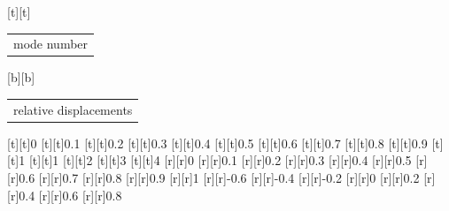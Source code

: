 %    
%
%
\begin{psfrags}%
\psfragscanon%
%
[t][t]{\color[rgb]{0,0,0}\setlength{\tabcolsep}{0pt}\begin{tabular}{c}mode number\end{tabular}}%
[b][b]{\color[rgb]{0,0,0}\setlength{\tabcolsep}{0pt}\begin{tabular}{c}relative displacements\end{tabular}}%
%
[t][t]{0}%
[t][t]{0.1}%
[t][t]{0.2}%
[t][t]{0.3}%
[t][t]{0.4}%
[t][t]{0.5}%
[t][t]{0.6}%
[t][t]{0.7}%
[t][t]{0.8}%
[t][t]{0.9}%
[t][t]{1}%
[t][t]{1}%
[t][t]{2}%
[t][t]{3}%
[t][t]{4}%
%
[r][r]{0}%
[r][r]{0.1}%
[r][r]{0.2}%
[r][r]{0.3}%
[r][r]{0.4}%
[r][r]{0.5}%
[r][r]{0.6}%
[r][r]{0.7}%
[r][r]{0.8}%
[r][r]{0.9}%
[r][r]{1}%
[r][r]{-0.6}%
[r][r]{-0.4}%
[r][r]{-0.2}%
[r][r]{0}%
[r][r]{0.2}%
[r][r]{0.4}%
[r][r]{0.6}%
[r][r]{0.8}%
%
%
\end{psfrags}%
%

